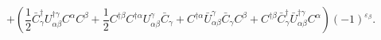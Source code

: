 \begin{equation}
+\left(\frac{1}{2}\bar{C}^\dagger_\gamma U^{\dagger\gamma}_{\alpha\beta}
C^\alpha C^\beta+\frac{1}{2}C^{\dagger\beta}C^{\dagger\alpha}
U^\gamma_{\alpha\beta}\bar{C}_\gamma+C^{\dagger\alpha}
\bar{U}^\gamma_{\alpha\beta}\bar{C}_\gamma C^\beta+
C^{\dagger\beta}\bar{C}^\dagger_\gamma\bar{U}^{\dagger\gamma}_{\alpha\beta}
C^\alpha\right)(-1)^{\varepsilon_\beta}.\label{5.9}
\end{equation}

